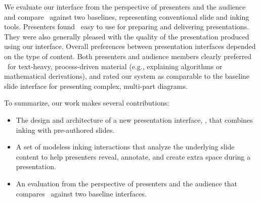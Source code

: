 We evaluate our interface from the perspective of presenters and the audience and compare \interface\ against two baselines, representing conventional slide and inking tools. Presenters found \interface\ easy to use for preparing and delivering presentations. They were also generally pleased with the quality of the presentation produced using our interface. 
%
Overall preferences between presentation interfaces depended on the type of content.
%
Both presenters and audience members clearly preferred \interface\ for text-heavy, process-driven material (e.g., explaining algorithms or mathematical derivations), and rated our system as comparable to the baseline slide interface for presenting complex, multi-part diagrams. 
%

To summarize, our work makes several contributions: 
\begin{itemize}
  \item The design and architecture of a new presentation interface, \interface, that combines inking with pre-authored slides.
\item A set of modeless inking interactions that analyze the underlying slide content to help presenters reveal, annotate, and create extra space during a presentation.
  \item An evaluation from the perspective of presenters and the audience that compares \interface\ against two baseline interfaces.
\end{itemize}





